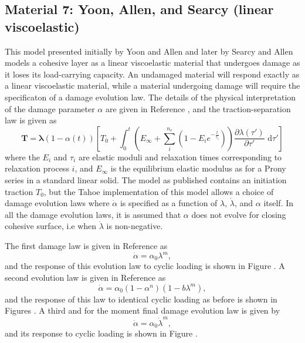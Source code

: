 \subsection{Material 7: Yoon, Allen, and Searcy (linear viscoelastic)}
\label{sect.material.surface.yoon}
This model presented initially by Yoon and Allen and later by
Searcy and Allen models a cohesive layer as a linear viscoelastic material
that undergoes damage as it loses its load-carrying capacity. An undamaged
material will respond exactly as a linear viscoelastic material, while
a material undergoing damage will require the specificaton of a 
damage evolution law. The details of the physical interpretation of 
the damage parameter $\alpha$ are given in Reference \cite{Allen1999}, and 
the traction-separation law is given as
\begin{equation}
\mathbf{T} = \boldsymbol{\lambda} (1-\alpha(t))\left[ T_0 + \int_0^t \left( E_\infty + \sum_i^{n_e} (1-E_i 
e^{-\frac{t}{\tau_i}})\right) \frac{\partial \lambda(\tau')}{\partial \tau'} \mbox{ d}
\tau' \right]
\end{equation}
where the $E_i$ and $\tau_i$ are elastic moduli and relaxation times
corresponding to relaxation process $i$, and $E_\infty$ is the equilibrium
elastic modulus as for a Prony series in a standard linear solid. 
The model as published contains an initiation traction $T_0$, but the 
Tahoe implementation of this model allows a choice of
damage evolution laws where $\dot{\alpha}$ is specified as a function
of $\lambda$, $\dot{\lambda}$, and $\alpha$ itself. In all the damage
evolution laws, it is assumed that $\alpha$ does not evolve for closing
cohesive surface, i.e when $\dot{\lambda}$ is non-negative. 

The first damage law is given in Reference \cite{Allen2001} as
\begin{equation}
\dot{\alpha} = \alpha_0 \lambda^m,
\end{equation}
and the response of this evolution law to cyclic loading is shown 
in Figure . A second evolution law is given in Reference \cite{Allen1999} as
\begin{equation}
\dot{\alpha} = \alpha_0 (1-\alpha^n) (1- b \lambda^m),
\end{equation}
and the response of this law to identical cyclic loading as before
is shown in Figures .
A third and for the moment final damage evolution law is given by
\begin{equation}
\dot{\alpha} = \alpha_0 \dot{\lambda}^m,
\end{equation}
and its response to cyclic loading is shown in Figure .

